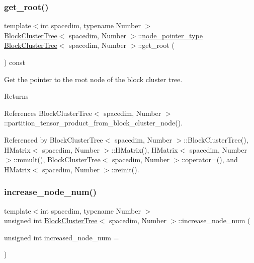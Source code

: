 \mbox{\label{classBlockClusterTree_a4a4f3b893380d1d7f53b772589a847d2}} 
\subsubsection{\texorpdfstring{get\+\_\+root()}{get\_root()}}
{\footnotesize\ttfamily template$<$int spacedim, typename Number $>$ \\
\hyperlink{classBlockClusterTree}{Block\+Cluster\+Tree}$<$ spacedim, Number $>$\+::\hyperlink{classTreeNode}{node\+\_\+pointer\+\_\+type} \hyperlink{classBlockClusterTree}{Block\+Cluster\+Tree}$<$ spacedim, Number $>$\+::get\+\_\+root (\begin{DoxyParamCaption}{ }\end{DoxyParamCaption}) const}

Get the pointer to the root node of the block cluster tree. \begin{DoxyReturn}{Returns}

\end{DoxyReturn}


References Block\+Cluster\+Tree$<$ spacedim, Number $>$\+::partition\+\_\+tensor\+\_\+product\+\_\+from\+\_\+block\+\_\+cluster\+\_\+node().



Referenced by Block\+Cluster\+Tree$<$ spacedim, Number $>$\+::\+Block\+Cluster\+Tree(), H\+Matrix$<$ spacedim, Number $>$\+::\+H\+Matrix(), H\+Matrix$<$ spacedim, Number $>$\+::mmult(), Block\+Cluster\+Tree$<$ spacedim, Number $>$\+::operator=(), and H\+Matrix$<$ spacedim, Number $>$\+::reinit().

\mbox{\label{classBlockClusterTree_aec9920e5b215fbfe2aa9f54980d3b30a}} 
\subsubsection{\texorpdfstring{increase\+\_\+node\+\_\+num()}{increase\_node\_num()}}
{\footnotesize\ttfamily template$<$int spacedim, typename Number $>$ \\
unsigned int \hyperlink{classBlockClusterTree}{Block\+Cluster\+Tree}$<$ spacedim, Number $>$\+::increase\+\_\+node\+\_\+num (\begin{DoxyParamCaption}\item[{unsigned int}]{increased\+\_\+node\+\_\+num = {} }\end{DoxyParamCaption})}

